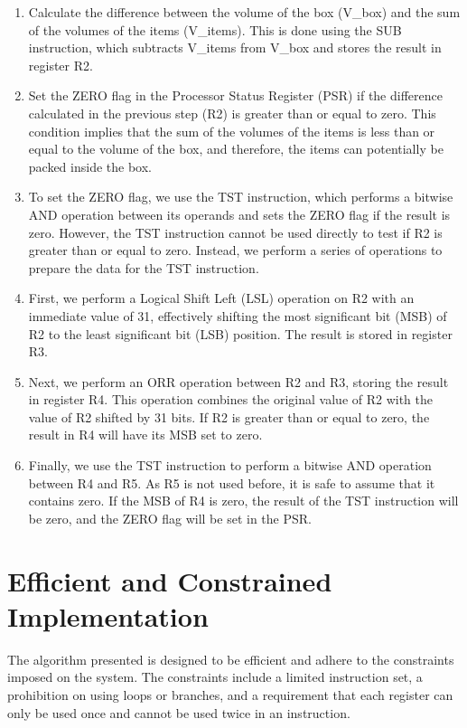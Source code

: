 \begin{thebibliography}{9}
\begin{enumerate}
    \item Calculate the difference between the volume of the box (V\_box) and the sum of the volumes of the items (V\_items). This is done using the SUB instruction, which subtracts V\_items from V\_box and stores the result in register R2.
    \item Set the ZERO flag in the Processor Status Register (PSR) if the difference calculated in the previous step (R2) is greater than or equal to zero. This condition implies that the sum of the volumes of the items is less than or equal to the volume of the box, and therefore, the items can potentially be packed inside the box.
    \item To set the ZERO flag, we use the TST instruction, which performs a bitwise AND operation between its operands and sets the ZERO flag if the result is zero. However, the TST instruction cannot be used directly to test if R2 is greater than or equal to zero. Instead, we perform a series of operations to prepare the data for the TST instruction.
    \item First, we perform a Logical Shift Left (LSL) operation on R2 with an immediate value of 31, effectively shifting the most significant bit (MSB) of R2 to the least significant bit (LSB) position. The result is stored in register R3.
    \item Next, we perform an ORR operation between R2 and R3, storing the result in register R4. This operation combines the original value of R2 with the value of R2 shifted by 31 bits. If R2 is greater than or equal to zero, the result in R4 will have its MSB set to zero.
    \item Finally, we use the TST instruction to perform a bitwise AND operation between R4 and R5. As R5 is not used before, it is safe to assume that it contains zero. If the MSB of R4 is zero, the result of the TST instruction will be zero, and the ZERO flag will be set in the PSR.
\end{enumerate}

\section{Efficient and Constrained Implementation}

The algorithm presented is designed to be efficient and adhere to the constraints imposed on the system. The constraints include a limited instruction set, a prohibition on using loops or branches, and a requirement that each register can only be used once and cannot be used twice in an instruction.


\end{thebibliography}
